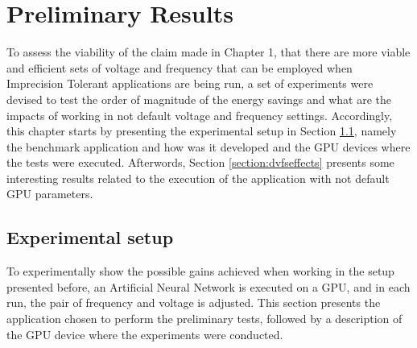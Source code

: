 
\chapter{Preliminary Results}
\label{chapter:preliminaryresults}

To assess the viability of the claim made in Chapter 1, that there are more viable and efficient sets of voltage and frequency that can be employed when Imprecision Tolerant applications are being run, a set of experiments were devised to test the order of magnitude of the energy savings and what are the impacts of working in not default voltage and frequency settings. Accordingly, this chapter starts by presenting the experimental setup in Section \ref{section:experimental_setup}, namely the benchmark application and how was it developed and the GPU devices where the tests were executed. Afterwords, Section \ref{section:dvfseffects} presents some interesting results related to the execution of the application with not default GPU parameters.


\section{Experimental setup}
\label{section:experimental_setup}

To experimentally show the possible gains achieved when working in the setup presented before, an Artificial Neural Network is executed on a GPU, and in each run, the pair of frequency and voltage is adjusted. This section presents the application chosen to perform the preliminary tests, followed by a description of the GPU device where the experiments were conducted.

